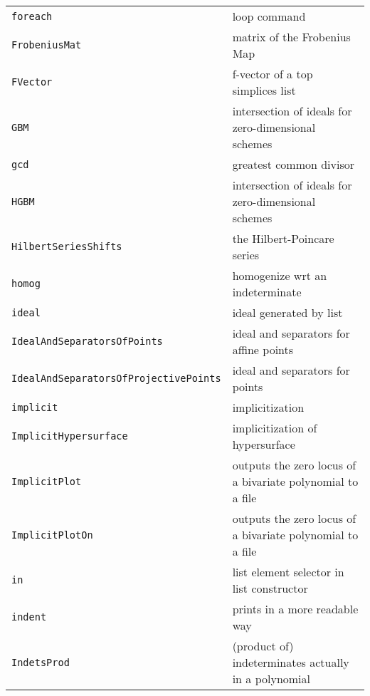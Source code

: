 \documentclass[a4paper]{mybook}
\begin{document}
\begin{center}
\begin{longtable}{ll}
{\verb~foreach~} &
      loop command\\
   
{\verb~FrobeniusMat~} &
      matrix of the Frobenius Map\\
   
{\verb~FVector~} &
      f-vector of a top simplices list\\
   
{\verb~GBM~} &
      intersection of ideals for zero-dimensional schemes\\
   
{\verb~gcd~} &
      greatest common divisor\\
   
{\verb~HGBM~} &
      intersection of ideals for zero-dimensional schemes\\
   
{\verb~HilbertSeriesShifts~} &
      the Hilbert-Poincare series\\
   
{\verb~homog~} &
      homogenize wrt an indeterminate\\
   
{\verb~ideal~} &
      ideal generated by list\\
   
{\verb~IdealAndSeparatorsOfPoints~} &
      ideal and separators for affine points\\
   
{\verb~IdealAndSeparatorsOfProjectivePoints~} &
      ideal and separators for points\\
   
{\verb~implicit~} &
      implicitization\\
   
{\verb~ImplicitHypersurface~} &
      implicitization of hypersurface\\
   
{\verb~ImplicitPlot~} &
      outputs the zero locus of a bivariate polynomial to a file\\
   
{\verb~ImplicitPlotOn~} &
      outputs the zero locus of a bivariate polynomial to a file\\
   
{\verb~in~} &
      list element selector in list constructor\\
   
{\verb~indent~} &
      prints in a more readable way\\
   
{\verb~IndetsProd~} &
      (product of) indeterminates actually in a polynomial\\
   

\end{longtable}
\end{center}
\end{document}
